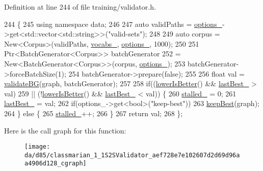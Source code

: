 Definition at line 244 of file training/validator.\+h.


\begin{DoxyCode}
244                                                      \{
245     \textcolor{keyword}{using namespace }data;
246 
247     \textcolor{keyword}{auto} validPaths = \hyperlink{classmarian_1_1Validator_a59fc30678618608874029374e386d3c0}{options\_}->get<std::vector<std::string>>(\textcolor{stringliteral}{"valid-sets"});
248 
249     \textcolor{keyword}{auto} corpus = New<Corpus>(validPaths, \hyperlink{classmarian_1_1Validator_ae6afb9838529db124fcc1aa8f0cb1fc9}{vocabs\_}, \hyperlink{classmarian_1_1Validator_a59fc30678618608874029374e386d3c0}{options\_}, 1000);
250 
251     Ptr<BatchGenerator<Corpus>> batchGenerator
252         = New<BatchGenerator<Corpus>>(corpus, \hyperlink{classmarian_1_1Validator_a59fc30678618608874029374e386d3c0}{options\_});
253     batchGenerator->forceBatchSize(1);
254     batchGenerator->prepare(\textcolor{keyword}{false});
255 
256     \textcolor{keywordtype}{float} val = \hyperlink{classmarian_1_1S2SValidator_a4b6ef1beacf57dce676851f740700573}{validateBG}(graph, batchGenerator);
257 
258     \textcolor{keywordflow}{if}((\hyperlink{classmarian_1_1S2SValidator_aea688081d232cfd12523c54b4869148a}{lowerIsBetter}() && \hyperlink{classmarian_1_1Validator_a6fbe055b2a8c2341172091b2bbde0a59}{lastBest\_} > val)
259        || (!\hyperlink{classmarian_1_1S2SValidator_aea688081d232cfd12523c54b4869148a}{lowerIsBetter}() && \hyperlink{classmarian_1_1Validator_a6fbe055b2a8c2341172091b2bbde0a59}{lastBest\_} < val)) \{
260       \hyperlink{classmarian_1_1Validator_a9fe2c3f4b9b5f38d1a2db2a9ba8704e8}{stalled\_} = 0;
261       \hyperlink{classmarian_1_1Validator_a6fbe055b2a8c2341172091b2bbde0a59}{lastBest\_} = val;
262       \textcolor{keywordflow}{if}(options\_->get<\textcolor{keywordtype}{bool}>(\textcolor{stringliteral}{"keep-best"}))
263         \hyperlink{classmarian_1_1S2SValidator_ae5a8f8799039bdac36790ef06158249e}{keepBest}(graph);
264     \} \textcolor{keywordflow}{else} \{
265       \hyperlink{classmarian_1_1Validator_a9fe2c3f4b9b5f38d1a2db2a9ba8704e8}{stalled\_}++;
266     \}
267     \textcolor{keywordflow}{return} val;
268   \};
\end{DoxyCode}


Here is the call graph for this function\+:
\nopagebreak
\begin{figure}[H]
\begin{center}
\leavevmode
\texttt{[image: da/d85/classmarian\_1\_1S2SValidator\_aef728e7e102607d2d69d96aa4906d128\_cgraph]}
\end{center}
\end{figure}


